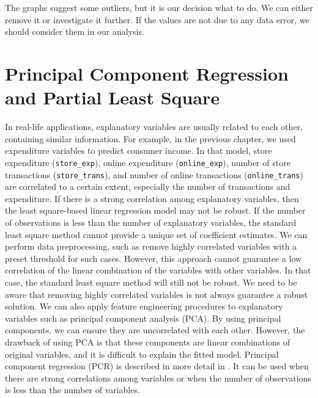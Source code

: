 \documentclass[
  12pt,
]{krantz}
\begin{document}
The graphs suggest some outliers, but it is our decision what to do. We can either remove it or investigate it further. If the values are not due to any data error, we should consider them in our analysis.

\hypertarget{principal-component-regression-and-partial-least-square}{%
\section{Principal Component Regression and Partial Least Square}\label{principal-component-regression-and-partial-least-square}}

In real-life applications, explanatory variables are usually related to each other, containing similar information. For example, in the previous chapter, we used expenditure variables to predict consumer income. In that model, store expenditure (\texttt{store\_exp}), online expenditure (\texttt{online\_exp}), number of store transactions (\texttt{store\_trans}), and number of online transactions (\texttt{online\_trans}) are correlated to a certain extent, especially the number of transactions and expenditure. If there is a strong correlation among explanatory variables, then the least square-based linear regression model may not be robust. If the number of observations is less than the number of explanatory variables, the standard least square method cannot provide a unique set of coefficient estimates. We can perform data preprocessing, such as remove highly correlated variables with a preset threshold for such cases. However, this approach cannot guarantee a low correlation of the linear combination of the variables with other variables. In that case, the standard least square method will still not be robust. We need to be aware that removing highly correlated variables is not always guarantee a robust solution. We can also apply feature engineering procedures to explanatory variables such as principal component analysis (PCA).  By using principal components, we can ensure they are uncorrelated with each other. However, the drawback of using PCA is that these components are linear combinations of original variables, and it is difficult to explain the fitted model. Principal component regression (PCR)  is described in more detail in \citep{Massy1965}. It can be used when there are strong correlations among variables or when the number of observations is less than the number of variables.
\end{document}
